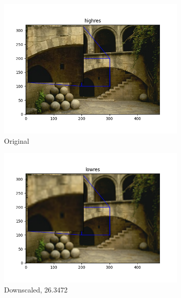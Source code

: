 \documentclass[12pt]{article}
\begin{document}
\begin{figure}[h!]
  \begin{subfigure}[b]{0.32\linewidth}
    \includegraphics[width=\linewidth]{./7-highres.png}
    \caption{Original}
  \end{subfigure}
  \hfill
  \begin{subfigure}[b]{0.32\linewidth}
    \includegraphics[width=\linewidth]{./7-lowres.png}
    \caption{Downscaled, 26.3472}
  \end{subfigure}
  \hfill
  \begin{subfigure}[b]{0.32\linewidth}

\end{subfigure}
\end{figure}
\end{document}
